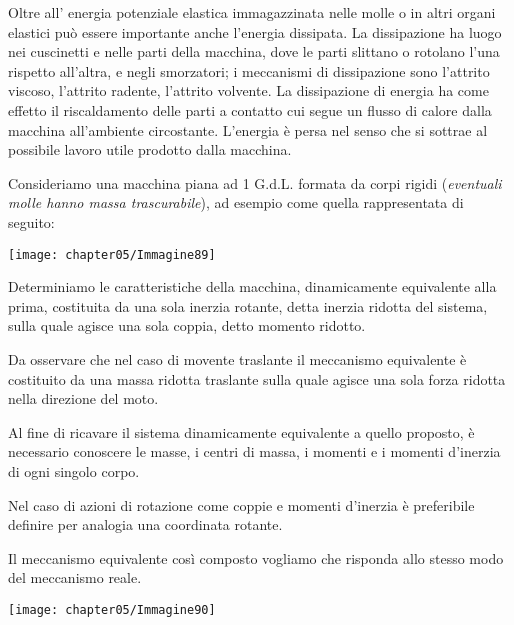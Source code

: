 		Oltre all' energia potenziale elastica immagazzinata nelle molle o in altri organi elastici può essere importante anche l'energia dissipata. La dissipazione ha luogo nei cuscinetti e nelle parti della macchina, dove le parti slittano o rotolano l'una rispetto all'altra, e negli smorzatori; i meccanismi di dissipazione sono l'attrito viscoso, l'attrito radente, l'attrito volvente. La dissipazione di energia ha come effetto il riscaldamento delle parti a contatto cui segue un flusso di calore dalla macchina all'ambiente circostante. L'energia è persa nel senso che si sottrae al possibile lavoro utile prodotto dalla macchina.
		
		Consideriamo una macchina piana ad 1 G.d.L. formata da corpi rigidi (\emph{eventuali molle hanno massa trascurabile}), ad esempio come quella rappresentata di seguito:
		
		\begin{minipage}{.5\textwidth}
		\centering
		\texttt{[image: chapter05/Immagine89]}
		\end{minipage}
		\hfill
		\begin{minipage}{.5\textwidth}
		Determiniamo le caratteristiche della macchina, dinamicamente equivalente alla prima, costituita da una sola inerzia rotante, detta inerzia ridotta del sistema, sulla quale agisce una sola coppia, detto momento ridotto. \newline
		
		Da osservare che nel caso di movente traslante il meccanismo equivalente è costituito da una massa ridotta traslante sulla quale agisce una sola forza ridotta nella direzione del moto.
		\end{minipage}
	
	\begin{minipage}{.7\textwidth}
	Al fine di ricavare il sistema dinamicamente equivalente a quello proposto, è necessario conoscere le masse, i centri di massa, i momenti e i momenti d'inerzia di ogni singolo corpo.
	
	Nel caso di azioni di rotazione come coppie e momenti d'inerzia è preferibile definire per analogia una coordinata rotante.
	
	Il meccanismo equivalente così composto vogliamo che risponda allo stesso modo del meccanismo reale.
	\end{minipage}
	\hfill
	\begin{minipage}{.25\textwidth}
	\centering
	\texttt{[image: chapter05/Immagine90]}
	\end{minipage}
	\vspace{1mm}
	
